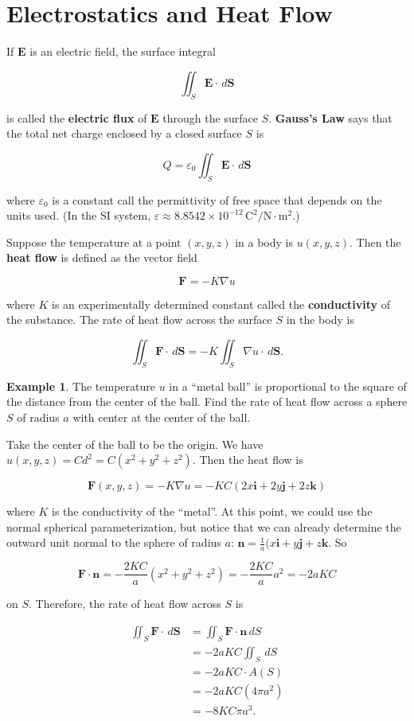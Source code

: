 \documentclass[11pt,oneside,english]{amsart}
\theoremstyle{definition}
\newtheorem*{example}{Example}
\begin{document}
\section*{Electrostatics and Heat Flow}

If $\mathbf{E}$ is an electric field, the surface integral

\[
\iint_S\mathbf{E}\cdot\,d\mathbf{S}
\]

is called the \textbf{electric flux} of $\mathbf{E}$ through the surface $S$. \textbf{Gauss's Law} says that the total net charge enclosed by a closed surface $S$ is 

\[
Q=\varepsilon_0\iint_S\mathbf{E}\cdot\,d\mathbf{S}
\]

where $\varepsilon_0$ is a constant call the permittivity of free space that depends on the units used. (In the SI system, $\varepsilon\approx8.8542\times10^{-12}\,\text{C}^2/\text{N$\cdot$m$^2$}$.)


Suppose the temperature at a point $(x,y,z)$ in a body is $u(x,y,z)$. Then the \textbf{heat flow} is defined as the vector field

\[
\mathbf{F}=-K\nabla u
\]

where $K$ is an experimentally determined constant called the \textbf{conductivity} of the substance. The rate of heat flow across the surface $S$ in the body is

\[
\iint_S\mathbf{F}\cdot\,d\mathbf{S}=-K\iint_S\nabla u\cdot\,d\mathbf{S}.
\]

\begin{example}

The temperature $u$ in a ``metal ball'' is proportional to the square of the distance from the center of the ball. Find the rate of heat flow across a sphere $S$ of radius $a$ with center at the center of the ball.

Take the center of the ball to be the origin. We have $u(x,y,z)=Cd^2=C(x^2+y^2+z^2)$. Then the heat flow is

\[
\mathbf{F}(x,y,z)=-K\nabla u=-KC(2x\mathbf{i}+2y\mathbf{j}+2z\mathbf{k})
\]

where $K$ is the conductivity of the ``metal''. At this point, we could use the normal spherical parameterization, but notice that we can already determine the outward unit normal to the sphere of radius $a$: $\mathbf{n}=\frac{1}{a}(x\mathbf{i}+y\mathbf{j}+z\mathbf{k}$. So 

\[
\mathbf{F}\cdot\mathbf{n}=-\frac{2KC}{a}(x^2+y^2+z^2)=-\frac{2KC}{a}a^2=-2aKC
\]

on $S$. Therefore, the rate of heat flow across $S$ is

\begin{align*}
\iint_S\mathbf{F}\cdot\,d\mathbf{S}&=\iint_S\mathbf{F}\cdot\mathbf{n}\,dS\\[2mm]
&=-2aKC\iint_S\,dS\\[2mm]
&=-2aKC\cdot A(S)\\[2mm]
&=-2aKC(4\pi a^2)\\[2mm]
&=-8KC\pi a^3.
\end{align*}
\end{example}
\end{document}
